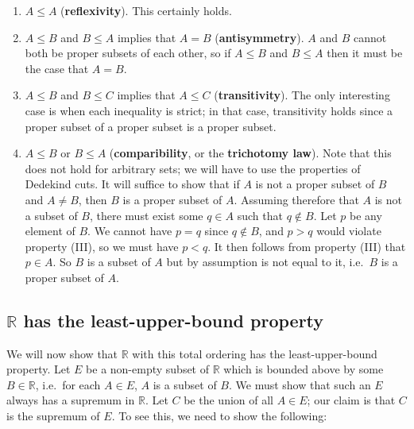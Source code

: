 \documentclass[12pt]{article}
\theoremstyle{definition}
\begin{document}
\begin{enumerate}[label = (O\arabic*)]
    \item \( A \leq A \) (\textbf{reflexivity}). This certainly holds.
    
    \item \( A \leq B \) and \( B \leq A \) implies that \( A = B \) (\textbf{antisymmetry}). \( A \) and \( B \) cannot both be proper subsets of each other, so if \( A \leq B \) and \( B \leq A \) then it must be the case that \( A = B \).
    
    \item \( A \leq B \) and \( B \leq C \) implies that \( A \leq C \) (\textbf{transitivity}). The only interesting case is when each inequality is strict; in that case, transitivity holds since a proper subset of a proper subset is a proper subset.
    
    \item \( A \leq B \) or \( B \leq A \) (\textbf{comparibility}, or the \textbf{trichotomy law}). Note that this does not hold for arbitrary sets; we will have to use the properties of Dedekind cuts. It will suffice to show that if \( A \) is not a proper subset of \( B \) and \( A \neq B \), then \( B \) is a proper subset of \( A \). Assuming therefore that \( A \) is not a subset of \( B \), there must exist some \( q \in A \) such that \( q \not\in B \). Let \( p \) be any element of \( B \). We cannot have \( p = q \) since \( q \not\in B \), and \( p > q \) would violate property (III), so we must have \( p < q \). It then follows from property (III) that \( p \in A \). So \( B \) is a subset of \( A \) but by assumption is not equal to it, i.e.\ \( B \) is a proper subset of \( A \).
\end{enumerate}

\subsection{\texorpdfstring{\(\mathbb{R}\)}{} has the least-upper-bound property}
\label{sec:R_has_lub_property}

We will now show that \( \mathbb{R} \) with this total ordering has the least-upper-bound property. Let \( E \) be a non-empty subset of \( \mathbb{R} \) which is bounded above by some \( B \in \mathbb{R} \), i.e.\ for each \( A \in E \), \( A \) is a subset of \( B \). We must show that such an \( E \) always has a supremum in \( \mathbb{R} \). Let \( C \) be the union of all \( A \in E \); our claim is that \( C \) is the supremum of \( E \). To see this, we need to show the following:
\end{document}
